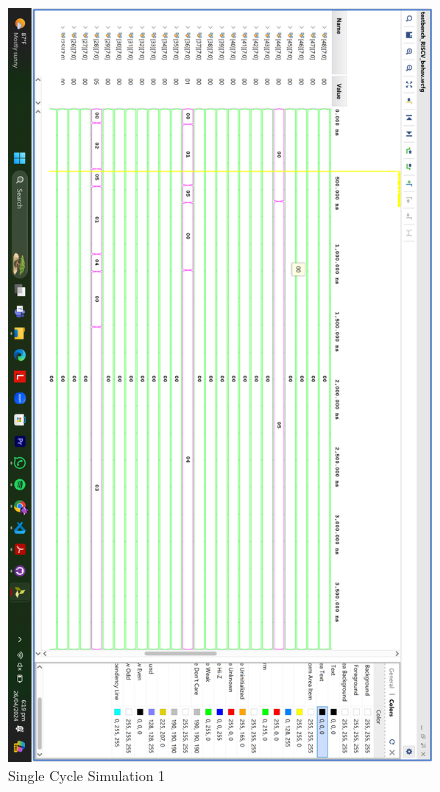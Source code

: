 \documentclass{report}
\begin{document}
\begin{figure}[h]
    \centerline{\includegraphics[scale = 0.2]{SingleCycle1.png}}
    \caption{Single Cycle Simulation 1}
\end{figure}
\end{document}

